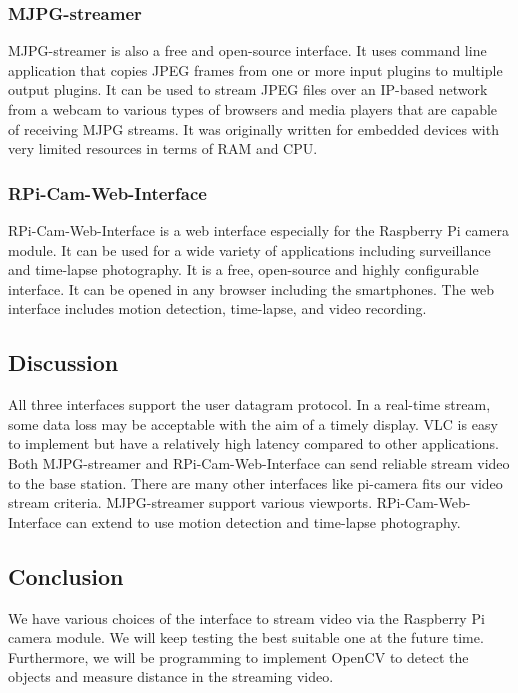 \documentclass[letterpaper, 10, draftclsnofoot, onecolumn,compsoc]{IEEEtran}
\begin{document}
\subsubsection{ MJPG-streamer }
MJPG-streamer \cite{r6} is also a free and open-source interface. It uses command line application that copies JPEG frames from one or more input plugins to multiple output plugins. It can be used to stream JPEG files over an IP-based network from a webcam to various types of browsers and media players that are capable of receiving MJPG streams. It was originally written for embedded devices with very limited resources in terms of RAM and CPU.

\subsubsection{ RPi-Cam-Web-Interface}
RPi-Cam-Web-Interface \cite{r9} is a web interface especially for the Raspberry Pi camera module. It can be used for a wide variety of applications including surveillance and time-lapse photography. It is a free, open-source and highly configurable interface. It can be opened in any browser including the smartphones. The web interface includes motion detection, time-lapse, and video recording.

\subsection{Discussion}
All three interfaces support the user datagram protocol. In a real-time stream, some data loss may be acceptable with the aim of a timely display. VLC is easy to implement but have a relatively high latency compared to other applications. Both MJPG-streamer and RPi-Cam-Web-Interface can send reliable stream video to the base station. There are many other interfaces like pi-camera fits our video stream criteria. MJPG-streamer support various viewports. RPi-Cam-Web-Interface can extend to use motion detection and time-lapse photography\cite{r9}.

\subsection{Conclusion}
We have various choices of the interface to stream video via the Raspberry Pi camera module. We will keep testing the best suitable one at the future time. Furthermore, we will be programming to implement OpenCV to detect the objects and measure distance in the streaming video.

\vspace{2mm}
\end{document}
